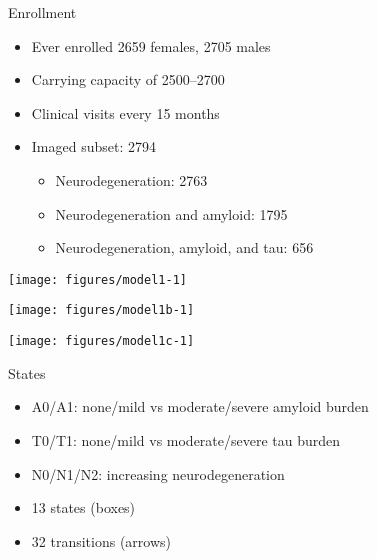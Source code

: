 \begin{frame}{Enrollment}
  \begin{itemize}
    \item Ever enrolled 2659 females, 
      2705 males
    \item Carrying capacity of 2500--2700
    \item Clinical visits every 15 months
    \item Imaged subset: 2794
      \begin{itemize}
        \item Neurodegeneration: 2763
        \item Neurodegeneration and amyloid: 1795
        \item Neurodegeneration, amyloid, and tau: 656
      \end{itemize}
  \end{itemize}
\end{frame}

\begin{frame}
\begin{knitrout}
\color{fgcolor}
\texttt{[image: figures/model1-1]} 

\end{knitrout}
\end{frame}

\begin{frame}
\begin{knitrout}
\color{fgcolor}
\texttt{[image: figures/model1b-1]} 

\end{knitrout}
\end{frame}

\begin{frame}
\begin{knitrout}
\color{fgcolor}
\texttt{[image: figures/model1c-1]} 

\end{knitrout}
\end{frame}

\begin{frame}{States}
  \begin{itemize}
    \item A0/A1: none/mild vs moderate/severe amyloid burden
    \item T0/T1: none/mild vs moderate/severe tau burden
    \item N0/N1/N2: increasing neurodegeneration
    \item 13 states (boxes)
    \item 32 transitions (arrows)
  \end{itemize}
\end{frame}

